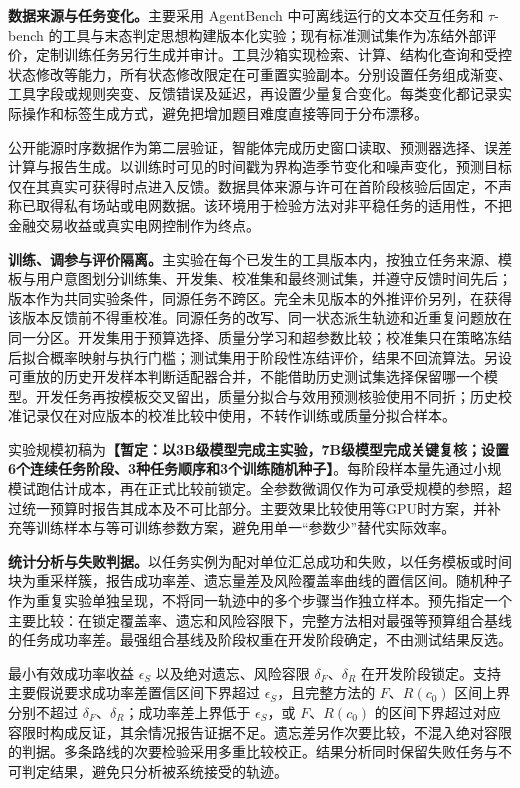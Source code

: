 \textbf{数据来源与任务变化。}主要采用 AgentBench 中可离线运行的文本交互任务和 $\tau$-bench 的工具与末态判定思想构建版本化实验；现有标准测试集作为冻结外部评价，定制训练任务另行生成并审计\cite{agentbench,taubench}。工具沙箱实现检索、计算、结构化查询和受控状态修改等能力，所有状态修改限定在可重置实验副本。分别设置任务组成渐变、工具字段或规则突变、反馈错误及延迟，再设置少量复合变化。每类变化都记录实际操作和标签生成方式，避免把增加题目难度直接等同于分布漂移。

公开能源时序数据作为第二层验证，智能体完成历史窗口读取、预测器选择、误差计算与报告生成。以训练时可见的时间戳为界构造季节变化和噪声变化，预测目标仅在其真实可获得时点进入反馈。数据具体来源与许可在首阶段核验后固定，不声称已取得私有场站或电网数据。该环境用于检验方法对非平稳任务的适用性，不把金融交易收益或真实电网控制作为终点。

\textbf{训练、调参与评价隔离。}主实验在每个已发生的工具版本内，按独立任务来源、模板与用户意图划分训练集、开发集、校准集和最终测试集，并遵守反馈时间先后；版本作为共同实验条件，同源任务不跨区。完全未见版本的外推评价另列，在获得该版本反馈前不得重校准。同源任务的改写、同一状态派生轨迹和近重复问题放在同一分区。开发集用于预算选择、质量分学习和超参数比较；校准集只在策略冻结后拟合概率映射与执行门槛；测试集用于阶段性冻结评价，结果不回流算法。另设可重放的历史开发样本判断适配器合并，不能借助历史测试集选择保留哪一个模型。开发任务再按模板交叉留出，质量分拟合与效用预测核验使用不同折；历史校准记录仅在对应版本的校准比较中使用，不转作训练或质量分拟合样本。

实验规模初稿为\textbf{【暂定：以3B级模型完成主实验，7B级模型完成关键复核；设置6个连续任务阶段、3种任务顺序和3个训练随机种子】}。每阶段样本量先通过小规模试跑估计成本，再在正式比较前锁定。全参数微调仅作为可承受规模的参照，超过统一预算时报告其成本及不可比部分。主要效果比较使用等GPU时方案，并补充等训练样本与等可训练参数方案，避免用单一“参数少”替代实际效率。

\textbf{统计分析与失败判据。}以任务实例为配对单位汇总成功和失败，以任务模板或时间块为重采样簇，报告成功率差、遗忘量差及风险覆盖率曲线的置信区间。随机种子作为重复实验单独呈现，不将同一轨迹中的多个步骤当作独立样本。预先指定一个主要比较：在锁定覆盖率、遗忘和风险容限下，完整方法相对最强等预算组合基线的任务成功率差。最强组合基线及阶段权重在开发阶段确定，不由测试结果反选。

最小有效成功率收益 $\epsilon_S$ 以及绝对遗忘、风险容限 $\delta_F$、$\delta_R$ 在开发阶段锁定。支持主要假说要求成功率差置信区间下界超过 $\epsilon_S$，且完整方法的 $F$、$R(c_0)$ 区间上界分别不超过 $\delta_F$、$\delta_R$；成功率差上界低于 $\epsilon_S$，或 $F$、$R(c_0)$ 的区间下界超过对应容限时构成反证，其余情况报告证据不足。遗忘差另作次要比较，不混入绝对容限的判据。多条路线的次要检验采用多重比较校正。结果分析同时保留失败任务与不可判定结果，避免只分析被系统接受的轨迹。

